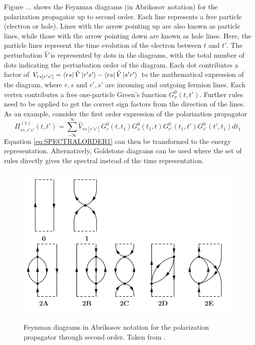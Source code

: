 Figure ... shows the Feynman diagrams (in Abrikosov notation) for the polarization propagator up to second order. Each line represents a free particle (electron or hole). Lines with the arrow pointing up are also known as particle lines, while those with the arrow pointing down are known as hole lines. Here, the particle lines represent the time evolution of the electron between $t$ and $t'$. The perturbation $\hat{V}$ is represented by dots in the diagrams, with the total number of dots indicating the perturbation order of the diagram. Each dot contributes a factor of $V_{rs[r's']}=\bra{\smash{rs}}\hat{V}\ket{\smash{r's'}} - \bra{\smash{rs}}\hat{V}\ket{\smash{s'r'}}$ to the mathematical expression of the diagram, where $r,s$ and $r',s'$ are incoming and outgoing fermion lines. Each vertex contributes a free one-particle Green's function $G^0_x(t,t')$. Further rules need to be applied to get the correct sign factors from the direction of the lines. As an example, consider the first order expression of the polarization propagator
\begin{equation}
\Pi^{(1)}_{rs,r's'}(t,t') = \sum_{-\infty}^{\infty} \hat{V}_{rs[r's']}  G^{0}_r(t,t_1) G^0_s(t_1,t) G^0_{r'}(t_1,t') G_{s'}^0(t',t_1) dt_1
\label{eq:SPECTRALORDER1}
\end{equation}
\noindent Equation \ref{eq:SPECTRALORDER1} can then be transformed to the energy representation. Alternatively, Goldstone diagrams can be used where the set of rules directly gives the spectral instead of the time representation. 

\begin{figure}
\centering
\includegraphics[scale=0.4]{Pics/POLPROP.png}
\label{fig:POLPROP}
\caption{Feynman diagrams in Abrikosov notation for the polarization propagator through second order. Taken from \cite{Sch2018}.}
\end{figure}

